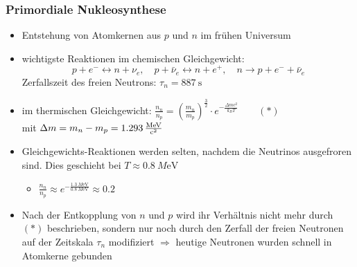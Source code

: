 \subsubsection{Primordiale Nukleosynthese}
\begin{itemize}
	\item Entstehung von Atomkernen aus $p$ und $n$ im frühen Universum
	\item wichtigste Reaktionen im chemischen Gleichgewicht:
		\begin{equation*}
			p+e^-\leftrightarrow n+\nu_e,\quad p+\bar{\nu}_e\leftrightarrow n+e^+,\quad n\to p+e^-+\bar{\nu}_e
		\end{equation*}
		Zerfallszeit des freien Neutrons: $\tau_n=\SI{887}{\s}$
	\item im thermischen Gleichgewicht: $\frac{n_n}{n_p}=\left(\frac{m_n}{m_p}\right)^\frac{3}{2}\cdot e^{-\frac{\Delta m c^2}{k_BT}}\qquad (\ast)$\\
		mit $\Delta m=m_n-m_p=\SI{1.293}{\frac{M\eV}{c^2}}$
	\item Gleichgewichts-Reaktionen werden selten, nachdem die Neutrinos ausgefroren sind. Dies geschieht bei $T\approx\SI{0.8}{M\eV}$
		\begin{itemize}
			\item $\frac{n_n}{n_p}\approx e^{-\frac{\SI{1.3}{M\eV}}{\SI{0.8}{M\eV}}}\approx \num{0.2}$
		\end{itemize}
	\item Nach der Entkopplung von $n$ und $p$ wird ihr Verhältnis nicht mehr durch $(\ast)$ beschrieben, sondern nur noch durch den Zerfall der freien Neutronen auf der Zeitskala $\tau_n$ modifiziert $\Rightarrow $ heutige Neutronen wurden schnell in Atomkerne gebunden
\end{itemize}
